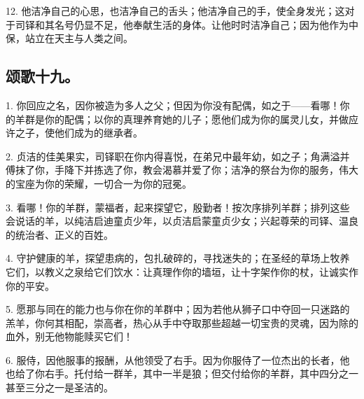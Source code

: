 12. 他洁净自己的心思，也洁净自己的舌头；他洁净自己的手，使全身发光；这对于司铎和其名号仍显不足，他奉献生活的身体。让他时时洁净自己；因为他作为中保，站立在天主与人类之间。\par


\subsection{颂歌十九。}

1. 你回应之名，因你被造为多人之父；但因为你没有配偶，如之于——看哪！你的羊群是你的配偶；以你的真理养育她的儿子；愿他们成为你的属灵儿女，并做应许之子，使他们成为的继承者。\par

2. 贞洁的佳美果实，司铎职在你内得喜悦，在弟兄中最年幼，如之子；角满溢并傅抹了你，手降下并拣选了你，教会渴慕并爱了你；洁净的祭台为你的服务，伟大的宝座为你的荣耀，一切合一为你的冠冕。\par

3. 看哪！你的羊群，蒙福者，起来探望它，殷勤者！按次序排列羊群；排列这些会说话的羊，以纯洁启迪童贞少年，以贞洁启蒙童贞少女；兴起尊荣的司铎、温良的统治者、正义的百姓。\par

4. 守护健康的羊，探望患病的，包扎破碎的，寻找迷失的；在圣经的草场上牧养它们，以教义之泉给它们饮水：让真理作你的墙垣，让十字架作你的杖，让诚实作你的平安。\par

5. 愿那与同在的能力也与你在你的羊群中；因为若他从狮子口中夺回一只迷路的羔羊，你何其相配，崇高者，热心从手中夺取那些超越一切宝贵的灵魂，因为除的血外，别无他物能赎买它们！\par

6. 服侍，因他服事的报酬，从他领受了右手。因为你服侍了一位杰出的长者，他也给了你右手。托付给一群羊，其中一半是狼；但交付给你的羊群，其中四分之一甚至三分之一是圣洁的。\par

